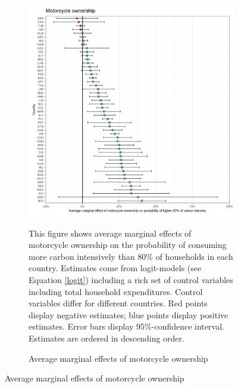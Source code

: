  \begin{figure}[ht!]\ContinuedFloat
   \centering
   \begin{subfigure}[b]{\textwidth}
   \centering
   \caption{Average marginal effects of motorcycle ownership} \label{fig:Logit_ME_motorcycle}
   \includegraphics{1_Figures/Analysis_Logit_Models_Marginal_Effects/Average_Marginal_Effects_affected_upper_80_motorcycle.01_2017.jpg}
   \begin{subcaption2}
     This figure shows average marginal effects of motorcycle ownership on the probability of consuming more carbon intensively than 80\% of households in each country. Estimates come from logit-models (see Equation \ref{logit}) including a rich set of control variables including total household expenditures. Control variables differ for different countries. Red points display negative estimates; blue points display positive estimates. Error bars display 95\%-confidence interval. Estimates are ordered in descending order.
   \end{subcaption2}
   \end{subfigure}
 \end{figure}
 \clearpage

